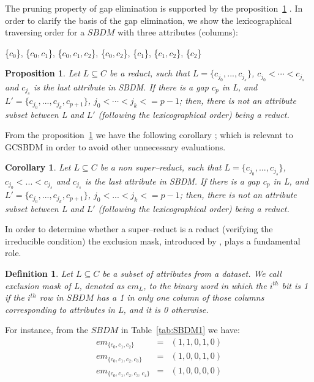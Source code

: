 \documentclass[authoryear,preprint,review,12pt]{elsarticle}
\newtheorem{proposition}{Proposition}
\newtheorem{definition}{Definition}
\newtheorem{corollary}{Corollary}
\begin{document}
	
	The pruning property of gap elimination is supported by the proposition~\ref{prop:gap} \citep{Santiesteban03}. In order to clarify	the basis of the gap elimination, we show the lexicographical traversing order for a $SBDM$ with three attributes (columns):
	
	\{$c_0$\}, \{$c_0,c_1$\}, \{$c_0,c_1,c_2$\}, \{$c_0,c_2$\}, \{$c_1$\}, \{$c_1,c_2$\}, \{$c_2$\}
		
	\begin{proposition}\label{prop:gap} 
		Let $L \subseteq C$ be a reduct, such that $L = \lbrace c_{j_0},...,c_{j_s}\rbrace$, $c_{j_0}<\cdots
		<c_{j_s}$ and $c_{j_s}$ is the last attribute in SBDM. If there is a gap $c_p$ in L, and $L' = \lbrace
		c_{j_0},...,c_{j_k},c_{p+1}\rbrace$, $j_0<\cdots <j_k<=p-1$; then, there is not an attribute subset
		between L and $L'$ (following the lexicographical order) being a reduct.
	\end{proposition}	
	
	From the proposition~\ref{prop:gap} we have the following corollary \citep{Santiesteban03}; which is relevant to GCSBDM in order to avoid other unnecessary evaluations.
	
	\begin{corollary}\label{coro:gap} 
		Let $L \subseteq C$ be a non super--reduct, such that $L = \lbrace c_{j_0},...,c_{j_s}\rbrace$, 
		$c_{j_0}<...<c_{j_s}$ and $c_{j_s}$ is the last attribute in SBDM. If there is a gap $c_p$ in L, and 
		$L' = \lbrace c_{j_0},...,c_{j_k},c_{p+1}\rbrace$, $j_0<...<j_k<=p-1$; then, there is not an attribute 
		subset between L and $L'$ (following the lexicographical order) being a reduct.
	\end{corollary}
		
	In order to determine whether a super--reduct is a reduct (verifying the irreducible condition) the
	exclusion mask, introduced by \cite{Lias09}, plays a fundamental role. 
	
	\begin{definition}\label{def:exclusion}
		Let $L \subseteq C$ be a subset of attributes from a dataset. We call exclusion mask of L, denoted as 
		$em_L$, to the binary word in which the $i^{\mathit{th}}$ bit is 1 if the $i^{\mathit{th}}$ row in $SBDM$
		has a 1 in only one 	column of those columns corresponding to attributes in L, and it is 0 otherwise.
	\end{definition}
	
	For instance, from the $SBDM$ in Table~\ref{tab:SBDM1} we have:
	$$\begin{array}{lcc}
	  em_{\lbrace c_0,c_1,c_2\rbrace}         &=& (1,1,0,1,0)\\
	  em_{\lbrace c_0,c_1,c_2,c_3\rbrace}     &=& (1,0,0,1,0)\\
	  em_{\lbrace c_0,c_1,c_2,c_3,c_4\rbrace} &=& (1,0,0,0,0)
	\end{array}$$
	
\end{document}
